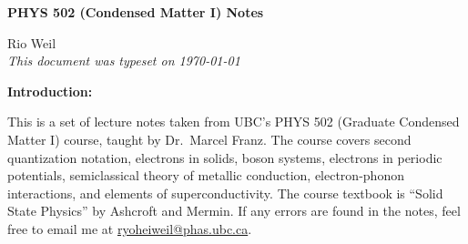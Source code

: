 \documentclass[10pt]{article}
\begin{document}
\begin{tcolorbox}
  \begin{center}
  \begin{Large}
    \textbf{PHYS 502 (Condensed Matter I) Notes} \\
    \vspace{5pt}
  \end{Large}
  \begin{large}
        Rio Weil \\
\vspace{5pt}
    \emph{This document was typeset on \today}
  \end{large}
  \end{center}
\end{tcolorbox}

\begin{center}
  \textbf{Introduction:}

  This is a set of lecture notes taken from UBC's PHYS 502 (Graduate Condensed Matter I) course, taught by Dr.\ Marcel Franz. The course covers second quantization notation, electrons in solids, boson systems, electrons in periodic potentials, semiclassical theory of metallic conduction, electron-phonon interactions, and elements of superconductivity. The course textbook is ``Solid State Physics'' by Ashcroft and Mermin. If any errors are found in the notes, feel free to email me at \href{mailto:ryoheiweil@phas.ubc.ca}{ryoheiweil@phas.ubc.ca}.

\end{center}
\tableofcontents

\newpage

\newpage

\newpage

\newpage
\setcounter{section}{4}

\newpage

\newpage

\newpage

\end{document}
